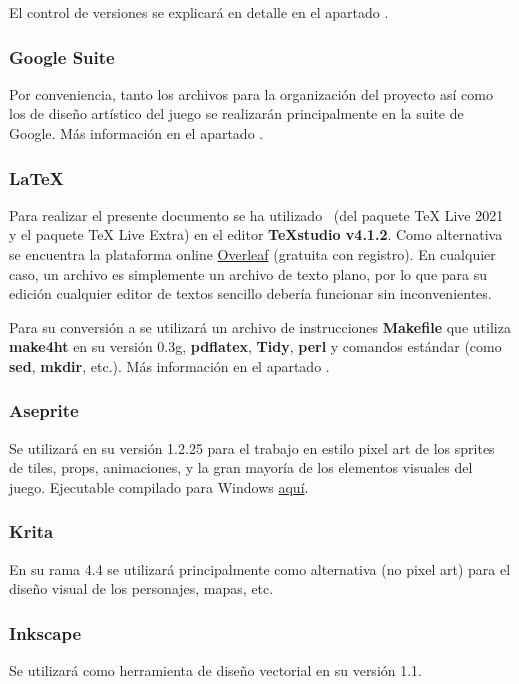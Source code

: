 El control de versiones se explicará en detalle en el apartado .

\subsubsection{Google Suite}
Por conveniencia, tanto los archivos para la organización del proyecto así como los de diseño artístico del juego se realizarán principalmente en la suite de Google. Más información en el apartado .

\subsubsection{LaTeX}
Para realizar el presente documento se ha utilizado \LaTeXe\ (del paquete TeX Live 2021 y el paquete TeX Live Extra) en el editor \textbf{TeXstudio v4.1.2}.  Como alternativa se encuentra la plataforma online \href{https://www.overleaf.com/}{Overleaf} (gratuita con registro). En cualquier caso, un archivo  es simplemente un archivo de texto plano, por lo que para su edición cualquier editor de textos sencillo debería funcionar sin inconvenientes.

Para su conversión a  se utilizará un archivo de instrucciones \textbf{Makefile} que utiliza \textbf{make4ht} en su versión 0.3g, \textbf{pdflatex}, \textbf{Tidy}, \textbf{perl} y comandos  estándar (como \textbf{sed}, \textbf{mkdir}, etc.). Más información en el apartado .

\subsubsection{Aseprite}
Se utilizará en su versión 1.2.25 para el trabajo en estilo pixel art de los sprites de tiles, props, animaciones,  y la gran mayoría de los elementos visuales del juego. Ejecutable compilado para Windows \href{https://drive.google.com/drive/folders/1DPhGeg7WzV9j81u3B5isgsXqoMtfd_Uv?usp=sharing}{aquí}.

\subsubsection{Krita}
En su rama 4.4 se utilizará principalmente como alternativa (no pixel art) para el diseño visual de los personajes, mapas, etc.

\subsubsection{Inkscape}
Se utilizará como herramienta de diseño vectorial en su versión 1.1.

